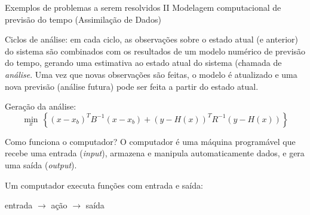 \documentclass[hyperref={pdfpagelabels=false}]{beamer}
\begin{document}
\begin{frame}{Exemplos de problemas a serem resolvidos II}
  Modelagem computacional de previsão do tempo (Assimilação de Dados)

	Ciclos de análise: em cada ciclo, as observações sobre o estado atual (e anterior) do sistema são combinados com os resultados de um modelo numérico de previsão do tempo, gerando uma estimativa ao estado atual do sistema (chamada de \emph{análise}. Uma vez que novas observações são feitas, o modelo é atualizado e uma nova previsão (análise futura) pode ser feita a partir do estado atual.
	
	Geração da análise:
	\begin{equation*}
	  \min_x \, \left\{ (x-x_b)^T B^{-1} (x-x_b) + (y-H(x))^TR^{-1}(y-H(x)) \right\}
	\end{equation*}
\end{frame}

\begin{frame}{Como funciona o computador?}
  O computador é uma máquina programável que recebe uma entrada (\emph{input}), armazena e manipula automaticamente dados, e gera uma saída (\emph{output}).
  \begin{center}
		\begin{alertblock}{}
			Um computador executa funções com entrada e saída:
			\begin{center}
				entrada $\rightarrow$ ação $\rightarrow$ saída
			\end{center}
		\end{alertblock}
	\end{center}
\end{frame}
\end{document}
